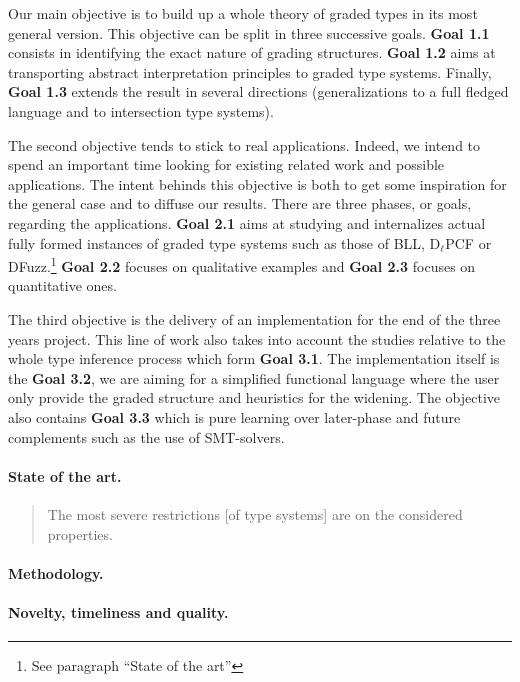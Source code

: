 \documentclass{article}[11pt]
\newcommand\BLL{BLL\xspace}
\newcommand\DlPCF{D$_\ell$PCF\xspace}
\newcommand\DFuzz{DFuzz\xspace}
\begin{document}
 Our main objective is to build up a whole theory of graded types in its most general version. This objective can be split in three successive goals. {\bf Goal 1.1} consists in identifying the exact nature of grading structures. {\bf Goal 1.2} aims at transporting abstract interpretation principles to graded type systems. Finally, {\bf Goal 1.3} extends the result in several directions (generalizations to a full fledged language and to intersection type systems).

 The second objective tends to stick to real applications. Indeed, we intend to spend an important time looking for existing related work and possible applications. The intent behinds this objective is both to get some inspiration for the general case and to diffuse our results. There are three phases, or goals, regarding the applications. {\bf Goal 2.1} aims at studying and internalizes actual fully formed instances of graded type systems such as those of \BLL, \DlPCF or \DFuzz.\footnote{See paragraph ``State of the art''} {\bf Goal 2.2} focuses on qualitative examples and {\bf Goal 2.3} focuses on quantitative ones.

 The third objective is the delivery of an implementation for the end of the three years project. This line of work also takes into account the studies relative to the whole type inference process which form {\bf Goal 3.1}. The implementation itself is the {\bf Goal 3.2}, we are aiming for a simplified functional language where the user only provide the graded structure and heuristics for the widening. The objective also contains {\bf Goal 3.3} which is pure learning over later-phase and future complements such as the use of SMT-solvers.


\paragraph{State of the art.}

\begin{quote}
  The most severe restrictions [of type systems] are on the considered properties.
\end{quote}


\paragraph{Methodology.}

\paragraph{Novelty, timeliness and quality.}
\end{document}
